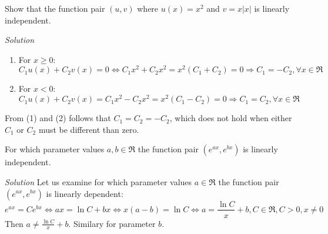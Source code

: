 \begin{example}
Show that the function pair $(u, v)$ where $u(x) = x^2$ and $v = x|x|$ is
linearly independent.

\noindent \emph{Solution} 
\begin{enumerate}
\item For $x \geq 0$: $C_1 u(x) + C_2 v(x) = 0 \Leftrightarrow C_1 x^2 + C_2
x^2 = x^2 (C_1 + C_2) = 0 \Rightarrow C_1 = -C_2, \forall x \in \Re$
\item For $x < 0$: $C_1 u(x) + C_2 v(x) = C_1 x^2 - C_2 x^2 = x^2 (C_1 - C_2) =
0 \Rightarrow C_1 = C_2, \forall x \in \Re$
\end{enumerate}
From (1) and (2) follows that $C_1 = C_2 = -C_2$, which does not hold when
either $C_1$ or $C_2$ must be different than zero.
\end{example}

\begin{example}
For which parameter values $a, b \in \Re$ the function pair $(e^{ax}, e^{bx})$
is linearly independent.

\noindent\emph{Solution}
Let us examine for which parameter values $a \in \Re$ the function pair
$(e^{ax}, e^{bx})$ is linearly dependent:
\[
e^{ax} = C e^{bx} \Leftrightarrow ax = \ln C + bx \Leftrightarrow x (a - b) =
\ln C \Leftrightarrow a = \frac{\ln C}{x} + b, C \in \Re, C > 0, x \neq 0
\]
Then $a \neq \frac{\ln C}{x} + b$. Similary for parameter $b$.
\end{example}
